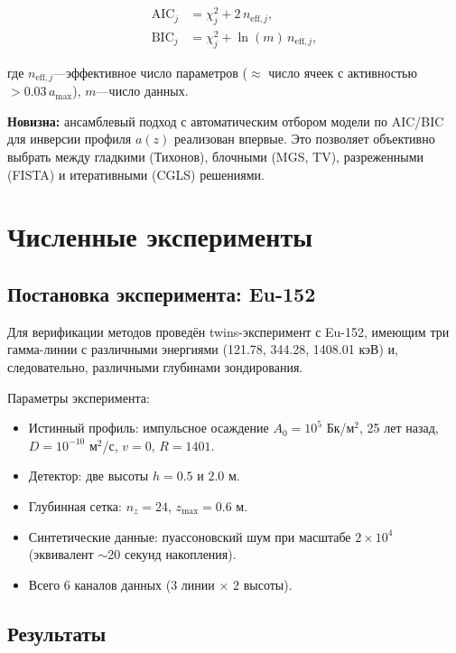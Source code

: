 \documentclass[12pt,a4paper]{article}
\begin{document}
\begin{align}
  \mathrm{AIC}_j &= \chi^2_j + 2\, n_{\mathrm{eff},j}, \label{eq:aic}\\
  \mathrm{BIC}_j &= \chi^2_j + \ln(m)\, n_{\mathrm{eff},j}, \label{eq:bic}
\end{align}

где $n_{\mathrm{eff},j}$---эффективное число параметров
($\approx$ число ячеек с активностью $> 0.03\, a_{\max}$),
$m$---число данных.

\textbf{Новизна:} ансамблевый подход с автоматическим отбором
модели по AIC/BIC для инверсии профиля $a(z)$
реализован впервые.
Это позволяет объективно выбрать между гладкими (Тихонов),
блочными (MGS, TV), разреженными (FISTA) и итеративными (CGLS)
решениями.


\section{Численные эксперименты}
\label{sec:experiments}

\subsection{Постановка эксперимента: Eu-152}
\label{sub:eu_setup}

Для верификации методов проведён twins-эксперимент с Eu-152,
имеющим три гамма-линии с различными энергиями
(121.78, 344.28, 1408.01 кэВ) и, следовательно, различными
глубинами зондирования.

Параметры эксперимента:
\begin{itemize}[leftmargin=*,itemsep=1pt]
  \item Истинный профиль: импульсное осаждение $A_0 = 10^5$ Бк/м$^2$,
        25 лет назад, $D = 10^{-10}$ м$^2$/с, $v = 0$, $R = 1401$.
  \item Детектор: две высоты $h = 0.5$ и $2.0$ м.
  \item Глубинная сетка: $n_z = 24$, $z_{\max} = 0.6$ м.
  \item Синтетические данные: пуассоновский шум при масштабе
        $2 \times 10^4$ (эквивалент $\sim$20 секунд накопления).
  \item Всего 6 каналов данных ($3$ линии $\times$ $2$ высоты).
\end{itemize}

\subsection{Результаты}
\label{sub:results}
\end{document}
